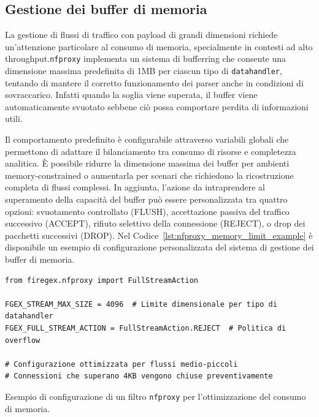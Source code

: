 \subsection{Gestione dei buffer di memoria}

La gestione di flussi di traffico con payload di grandi dimensioni richiede un'attenzione particolare al consumo di memoria, specialmente in contesti ad alto throughput.\@ \texttt{\gls{nfproxy}} implementa un sistema di bufferring che consente una dimensione massima predefinita di 1MB per ciascun tipo di \texttt{datahandler}, tentando di mantere il corretto funzionamento dei parser anche in condizioni di sovraccarico. Infatti quando la soglia viene superata, il buffer viene automaticamente svuotato sebbene ciò possa comportare perdita di informazioni utili.

Il comportamento predefinito è configurabile attraverso variabili globali che permettono di adattare il bilanciamento tra consumo di risorse e completezza analitica. È possibile ridurre la dimensione massima dei buffer per ambienti memory-constrained o aumentarla per scenari che richiedono la ricostruzione completa di flussi complessi. In aggiunta, l'azione da intraprendere al superamento della capacità del buffer può essere personalizzata tra quattro opzioni: svuotamento controllato (FLUSH), accettazione passiva del traffico successivo (ACCEPT), rifiuto selettivo della connessione (REJECT), o drop dei pacchetti successivi (DROP). Nel Codice~\ref{lst:nfproxy_memory_limit_example} è disponibile un esempio di configurazione personalizzata del sistema di gestione dei buffer di memoria.

\begin{listing}[H]
\begin{verbatim}
from firegex.nfproxy import FullStreamAction

FGEX_STREAM_MAX_SIZE = 4096  # Limite dimensionale per tipo di datahandler
FGEX_FULL_STREAM_ACTION = FullStreamAction.REJECT  # Politica di overflow

# Configurazione ottimizzata per flussi medio-piccoli
# Connessioni che superano 4KB vengono chiuse preventivamente
\end{verbatim}
\vspace{-1em}
\caption{Esempio di configurazione di un filtro \texttt{nfproxy} per l'ottimizzazione del consumo di memoria.}\label{lst:nfproxy_memory_limit_example}
\end{listing}

